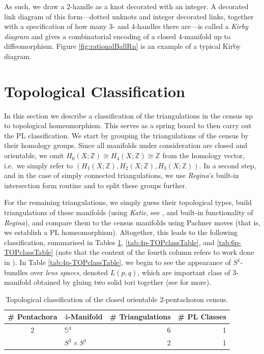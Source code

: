 \documentclass[pdflatex,sn-mathphys-num]{sn-jnl}
\theoremstyle{thmstyleone}%
\theoremstyle{thmstyletwo}%
\theoremstyle{thmstylethree}%
\newcommand{\bz}{\mathbb{Z}}
\theoremstyle{remark}
\begin{document}
As such, we draw a $2$-handle as a knot decorated with an integer. A decorated link diagram of this form---dotted unknots and integer decorated links, together with a specification of how many $3$- and $4$-handles there are---is called a \emph{Kirby diagram} and gives a combinatorial encoding of a closed $4$-manifold up to diffeomorphism. Figure \ref{fig:rationalBallRn} is an example of a typical Kirby diagram.

\section{Topological Classification}
\label{sec:top-class}

In this section we describe a classification of the triangulations in the census up to topological homeomorphism. This serves as a spring board to then carry out the PL classification. We start by grouping the triangulations of the census by their homology groups. Since all manifolds under consideration are closed and orientable, we omit $H_0(X;\bz)\cong H_4(X;\bz) \cong \bz$ from the homology vector, i.e.\ we simply refer to $(H_1(X;\bz),H_2(X;\bz),H_3(X;\bz))$. In a second step, and in the case of simply connected triangulations, we use  \emph{Regina}'s built-in intersection form routine and  to split these groups further.

For the remaining triangulations, we simply guess their topological types, build triangulations of these manifolds (using \emph{Katie}, see , and built-in functionality of \emph{Regina}), and compare them to the census manifolds using Pachner moves (that is, we establish a PL homeomorphism). Altogether, this leads to the following classification, summarised in Tables \ref{tab:2p-TOPclassTable}, \ref{tab:4p-TOPclassTable}, and \ref{tab:6p-TOPclassTable} (note that the content of the fourth column refers to work done in ). In Table \ref{tab:4p-TOPclassTable}, we begin to see the appearance of $S^1$-bundles over \emph{lens spaces}, denoted $L(p,q)$, which are important class of $3$-manifold obtained by gluing two solid tori together (see \cite{saveliev2012lectures} for more).

\begin{table}[ht]
        \caption{Topological classification of the closed orientable 2-pentachoron census.}
    \label{tab:2p-TOPclassTable}
    \begin{tabular}{clrr}
    	\toprule
        \# Pentachora & $4$-Manifold & \# Triangulations & \# PL Classes\\
	\midrule
        2   & $\mathbb{S}^4$ & 6 & 1\\
            & $S^3\times S^1$ & 2 & 1\\
            \bottomrule
    \end{tabular}
\end{table}
\end{document}
